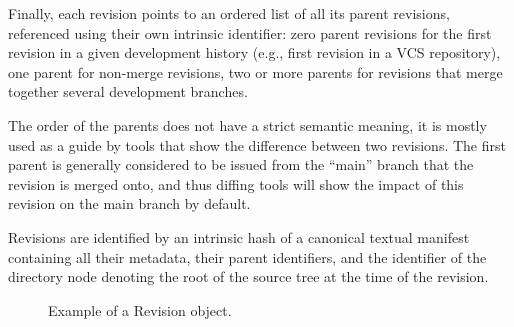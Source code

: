 Finally, each revision points to an ordered list of all its parent revisions,
referenced using their own intrinsic identifier: zero parent revisions for the
first revision in a given development history (e.g., first revision in a VCS
repository), one parent for non-merge revisions, two or more parents for
revisions that merge together several development branches.

The order of the parents does not have a strict semantic meaning, it is mostly
used as a guide by tools that show the difference between two revisions. The
first parent is generally considered to be issued from the ``main'' branch that
the revision is merged onto, and thus diffing tools will show the impact of
this revision on the main branch by default.

Revisions are identified by an intrinsic hash of a canonical textual
manifest containing all their metadata, their parent identifiers, and the
identifier of the directory node denoting the root of the source tree at the
time of the revision.

\begin{figure}%
    \centering
\caption{Example of a Revision object.}
\end{figure}


\begin{figure}\centering
{}
\end{figure}
